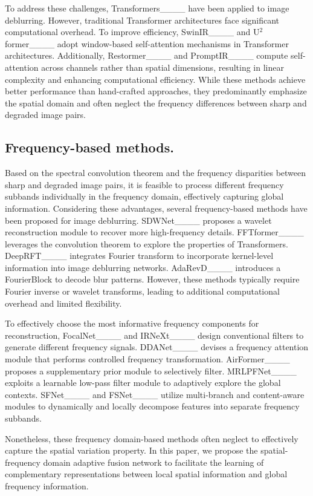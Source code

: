 To address these challenges, Transformers____ have been applied to image deblurring. However, traditional Transformer architectures face significant computational overhead.
To improve efficiency, SwinIR____ and U$^2$former____ adopt window-based self-attention mechanisms in Transformer architectures. Additionally, Restormer____ and PromptIR____ compute self-attention across channels rather than spatial dimensions, resulting in linear complexity and enhancing computational efficiency.
While these methods achieve better performance than  hand-crafted approaches, they predominantly emphasize the spatial domain and often neglect the frequency differences between sharp and degraded image pairs. 


\subsection{Frequency-based methods.}
Based on the spectral convolution theorem and the frequency disparities between sharp and degraded image pairs, it is feasible to process different frequency subbands individually in the frequency domain, effectively capturing global information.  Considering these advantages, several frequency-based methods have been proposed for image deblurring.
SDWNet____ proposes a wavelet reconstruction module to recover more high-frequency details. FFTformer____ leverages the convolution theorem to explore the properties of Transformers. DeepRFT____ integrates Fourier transform to incorporate kernel-level information into image deblurring networks. AdaRevD____ introduces a FourierBlock to decode blur patterns. However, these methods typically require Fourier inverse or wavelet transforms, leading to additional computational overhead and limited flexibility.


To effectively choose the most informative frequency components for reconstruction, FocalNet____ and IRNeXt____ design conventional filters to generate different frequency signals. DDANet____ devises a frequency attention module that performs controlled frequency transformation. AirFormer____ proposes a supplementary prior module to selectively filter. MRLPFNet____ exploits a learnable low-pass filter module to adaptively explore the global contexts.
SFNet____ and FSNet____ utilize multi-branch and content-aware modules to dynamically and locally decompose features into separate frequency subbands.

Nonetheless, these frequency domain-based methods often neglect to effectively capture the spatial variation property.  In this paper, we propose the spatial-frequency domain adaptive fusion network to  facilitate the learning of complementary representations between local spatial information and global frequency information.